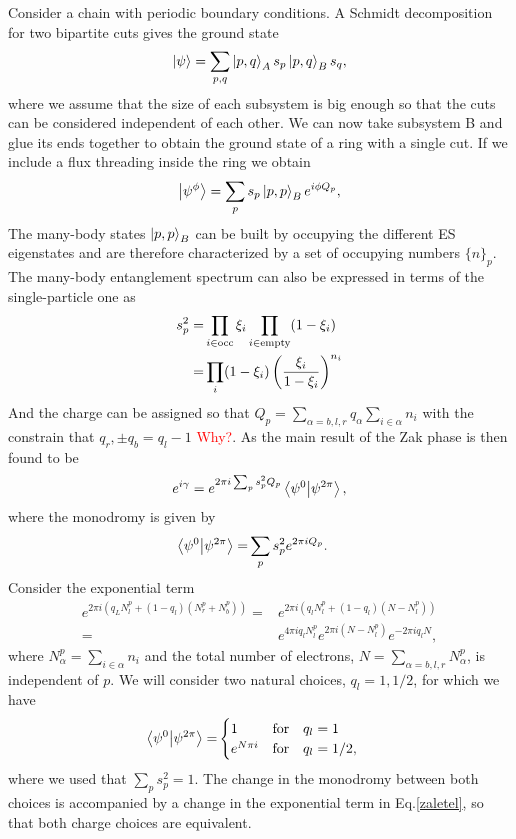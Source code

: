 \documentclass[twocolumn,amsmath,longbibliography,amssymb,superscriptaddress]{revtex4-1}
\begin{document}
Consider a chain with periodic boundary conditions. A Schmidt decomposition for two bipartite cuts gives the ground state
\begin{equation}
\ket{\psi} = \sum_{p,q} \ket{p,q}_A s_p \ket{p,q}_B s_q,
\end{equation}
where we assume that the size of each subsystem is big enough so that the cuts can be considered independent of each other. We can now take subsystem B and glue its ends together to obtain the ground state of a ring with a single cut. If we include a flux threading inside the ring we obtain
\begin{equation}
\ket{\psi^\phi} = \sum_p s_p \ket{p,p}_B e^{i\phi Q_p},
\end{equation}
The many-body states $\ket{p,p}_B$ can be built by occupying the different ES eigenstates and are therefore characterized by a set of occupying numbers $\{n\}_p$. The many-body entanglement spectrum can also be expressed in terms of the single-particle one \cite{Alexandrinata2011} as
\begin{align}
s_p^2 =& \prod_{i \in {\rm occ}} \xi_i \prod_{i \in {\rm empty}}(1-\xi_i) \\
=& \prod_i (1-\xi_i)\left(\frac{\xi_i}{1-\xi_i} \right)^{n_i}
\end{align}
And the charge can be assigned so that $Q_p = \sum_{\alpha = b,l,r} q_\alpha\sum_{i \in \alpha} n_i$ with the constrain that $q_r,\pm q_b = q_l-1$ \textcolor{red}{Why?}. As the main result of \cite{Zaletel2014} the Zak phase is then found to be
\begin{align}
e^{i\gamma} = e^{2\pi i \sum_p s_p^2 Q_p}  \bra{\psi^0}\ket{\psi^{2\pi}},
\label{zaletel}
\end{align}
where the monodromy is given by
\begin{align}
\bra{\psi^0}\ket{\psi^{2\pi}} =& \sum_p s_p^2 e^{2\pi i Q_p}.
\end{align}
Consider the exponential term
\begin{align*}
e^{2\pi i (q_L N^p_l + (1-q_l)(N^p_r+N^p_b))} =& e^{2\pi i (q_l N^p_l + (1-q_l)(N-N^p_l))} \\
=& e^{4\pi i q_l N^p_l}e^{2 \pi i (N-N^p_l)}e^{-2\pi i q_l N },
\end{align*}
where $N^p_\alpha = \sum_{i \in \alpha} n_i$ and the total number of electrons, $N = \sum_{\alpha = b,l,r} N^p_\alpha$, is independent of $p$. We will consider two natural choices, $q_l = 1,1/2$, for which we have
\begin{align}
\bra{\psi^0}\ket{\psi^{2\pi}} =& 
\begin{cases}
1 & \text{for} \quad q_l = 1 \\
e^{N\pi i} & \text{for} \quad q_l = 1/2,
\end{cases}
\end{align}
where we used that $\sum_p s_p^2 = 1$. The change in the monodromy between both choices is accompanied by a change in the exponential term in Eq.\ref{zaletel}, so that both charge choices are equivalent.
\end{document}
